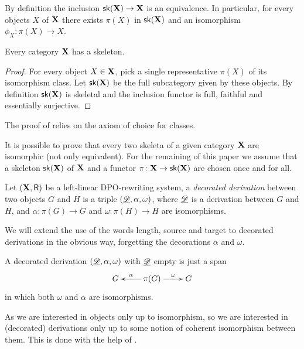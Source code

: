 \begin{remark}
	By definition the inclusion $\mathsf{sk}(\textbf {\textup{X}}) \to \textbf {\textup{X}}$ is an equivalence. In particular, for every objects $X$ of $\textbf {\textup{X}}$ there exists $\pi(X)$ in $\mathsf{sk}(\textbf {\textup{X}})$ and an isomorphism $\phi_X\colon \pi(X) \to X$.
\end{remark}

\begin{proposition}\label{prop:ske}
	Every category $\textbf {\textup{X}}$ has a skeleton. 
\end{proposition}
\begin{proof}
	For every object $X\in \textbf {\textup{X}}$, pick a single representative $\pi(X)$ of its isomorphism class. Let $\mathsf{sk}(\textbf {\textup{X}})$ be the full subcategory given by these objects. By definition $\mathsf{sk}(\textbf {\textup{X}})$ is skeletal and the inclusion functor is full, faithful and essentially surjective.\qedhere 
\end{proof}
\begin{remark}
	The proof of  relies on the axiom of choice for classes.
\end{remark}
\begin{remark}
	It is possible to prove that every two skeleta of a given category $\textbf {\textup{X}}$ are isomorphic (not only equivalent). For the remaining of this paper we assume that a skeleton $\mathsf{sk}(\textbf {\textup{X}})$ of $\textbf {\textup{X}}$ and a functor $\pi\colon \textbf {\textup{X}}\to \mathsf{sk}(\textbf {\textup{X}})$ are chosen once and for all.
\end{remark}

\begin{definition}
	Let $(\textbf {\textup{X}}, \mathsf{R})$ be a left-linear DPO-rewriting system, a \emph{decorated derivation} between two objects $G$ and $H$ is a triple $(\underline{\mathscr{D}}, \alpha, \omega)$, where $\underline{\mathscr{D}}$ is a derivation between $G$ and $H$, and $\alpha\colon \pi(G)\to G$ and $\omega\colon \pi(H)\to H$ are isomorphisms.
\end{definition}

\begin{notation}
	We will extend the use of the words length, source and target to decorated derivations in the obvious way, forgetting the decorations $\alpha$ and $\omega$.
\end{notation}

\begin{example}A decorated derivation $(\underline{\mathscr{D}}, \alpha, \omega)$ with $\underline{\mathscr{D}}$ empty is just a span
	\[\xymatrix{G & \pi(G) \ar[r]^-{\omega} \ar[l]_-{\alpha} & G}\]
	in which both $\omega$ and $\alpha$ are isomorphisms.
\end{example}

As we are interested in objects only up to isomorphism, so we are interested in (decorated) derivations only up to some notion of coherent isomorphism between them. This is done with the help of .

